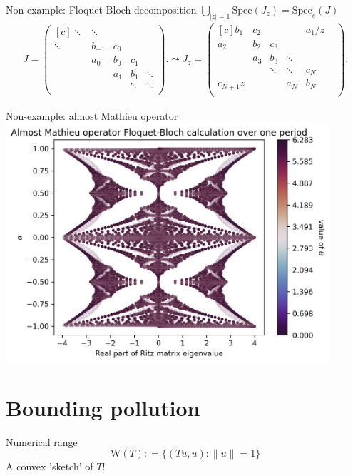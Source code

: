 \documentclass[14pt]{beamer}
\newcommand{\Spec}{\mathrm{Spec}} %
\newcommand{\Num}{\mathrm{W}} %
\newcommand{\eqdef}{\mathrel{\mathop:}=} %
\begin{document}
\begin{frame}{Non-example: Floquet-Bloch decomposition}
  \centering
  $\bigcup_{|z|=1} \Spec(J_z) = \Spec_e(J)$ 
  \tiny{
    \begin{align*}
      J=
  \begin{pmatrix*}[c]
    \ddots & \ddots & & & \\
    \ddots & b_{-1} & c_0 & & \\
    & a_0 & b_0 & c_1 & \\
    & & a_1 & b_1 & \ddots \\
    & & & \ddots & \ddots \\
  \end{pmatrix*}.
    \leadsto
    J_z = 
    \begin{pmatrix*}[c]
      b_1 & c_2 & & & a_1/z\\
      a_2 & b_2 & c_3 & & & \\
      & a_3 & b_3 & \ddots & & \\
      & & \ddots & \ddots & c_N & \\
      c_{N+1} z & & & a_N & b_N\\
    \end{pmatrix*}.
    \end{align*}
  }
\end{frame}

\begin{frame}{Non-example: almost Mathieu operator}
  \includegraphics[width=0.9\textwidth]{hofstadter-butterfly}
\end{frame}

\section{Bounding pollution}
\begin{frame}{Numerical range}
  \centering
  $$\Num(T) \eqdef \{(Tu, u) : \|u\| = 1\}$$
  A convex 'sketch' of $T$!
\end{frame}
\end{document}
